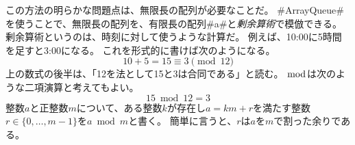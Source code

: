 この方法の明らかな問題点は、無限長の配列が必要なことだ。
#ArrayQueue#を使うことで、無限長の配列を、有限長の配列#a#と\emph{剰余算術}で模倣できる。
%
剰余算術というのは、時刻に対して使うような計算だ。
例えば、10:00に5時間を足すと3:00になる。
これを形式的に書けば次のようになる。
\[
    10 + 5 = 15 \equiv 3 \pmod{12}
\]
上の数式の後半は、「12を法として15と3は合同である」と読む。
$\bmod$は次のような二項演算と考えてもよい。
\[
   15 \bmod 12 = 3
\]
整数$a$と正整数$m$について、ある整数$k$が存在し$a = km + r$を満たす整数$r \in \{0, \ldots, m-1 \}$を$a \bmod m $と書く。
簡単に言うと、$r$は$a$を$m$で割った余りである。
